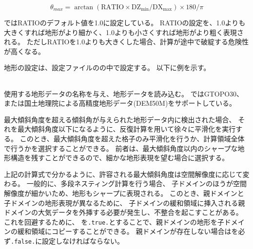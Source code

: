 \[ \theta_{max} = \arctan( \mathrm{RATIO} \times \mathrm{DZ_{min}}/\mathrm{DX_{max}} ) \times 180/\pi \]

\scalerm ではRATIOのデフォルト値を1.0に設定している。
RATIOの設定を、1.0よりも大きくすれば地形がより細かく、1.0よりも小さくすれば地形がより粗く表現される。
ただしRATIOを1.0よりも大きくした場合、計算が途中で破綻する危険性が高くなる。

地形の設定は、設定ファイルのの中で設定する。
以下に例を示す。\\

\\


使用する地形データの名称を与え、地形データを読み込む。
\scalerm ではGTOPO30、または国土地理院による高精度地形データ(DEM50M)をサポートしている。

最大傾斜角度を超える傾斜角が与えられた地形データ内に検出された場合、
それを最大傾斜角度以下になるように、反復計算を用いて徐々に平滑化を実行する。
このとき、最大傾斜角度を超えた格子のみ平滑化を行うか、計算領域全体で行うかを選択することができる。
前者は、最大傾斜角度以内のシャープな地形構造を残すことができるので、細かな地形表現を望む場合に選択する。

上記の計算式で分かるように、許容される最大傾斜角度は空間解像度に応じて変わる。
一般的に、多段ネスティング計算を行う場合、
子ドメインのほうが空間解像度が細かいため、地形もシャープに表現される。
このとき、親ドメインと子ドメインの地形表現が異なるために、
子ドメインの緩和領域に挿入される親ドメインの大気データを外挿する必要が発生し、不整合を起こすことがある。
これを回避するために、
を\verb|.true.|とすることで、親ドメインの地形を子ドメインの緩和領域にコピーすることができる。
親ドメインが存在しない場合はを必ず\verb|.false.|に設定しなければならない。
